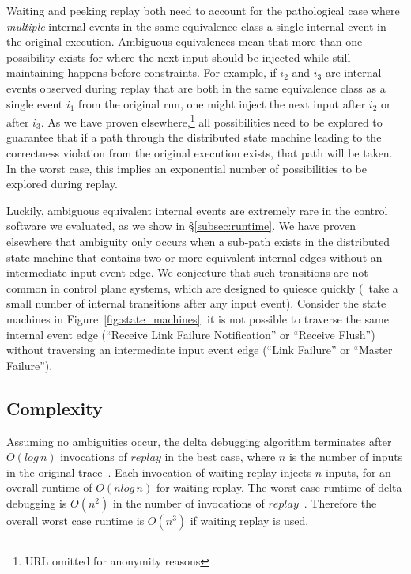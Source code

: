 
Waiting and peeking replay both need to account for the pathological case
where {\em multiple} internal events
in the same
equivalence class a single internal event in the original execution.
Ambiguous equivalences mean that more than one possibility exists for where
the next input should be
injected while still maintaining happens-before constraints. For example, if $i_2$ and $i_3$ are internal events observed
during replay that are both in the same equivalence class as a single event $i_1$ from the
original run, one might inject the next input after $i_2$ or after $i_3$.
As we have proven elsewhere,\footnote{URL omitted for anonymity reasons}
all possibilities need to be explored to guarantee that if a path through the
distributed state machine leading to
the correctness violation from the original execution exists, that path will be taken. In the worst case,
this implies an exponential number of possibilities to be explored during
replay.

Luckily, ambiguous equivalent internal events are extremely rare in the
control software we evaluated, as we
show in \S\ref{subsec:runtime}. We have proven elsewhere that ambiguity only
occurs when a sub-path exists in the distributed state machine that contains two or
more equivalent internal edges without an intermediate input event edge.
We conjecture that such transitions are not common in control plane systems,
which are designed to quiesce quickly (\ie~take a small number of internal
transitions after any input event). Consider the state machines in Figure~\ref{fig:state_machines}:
it is not possible to traverse the same internal event edge (``Receive Link
Failure Notification'' or ``Receive Flush'') without traversing an
intermediate input event edge (``Link Failure'' or ``Master Failure'').

\subsection{Complexity}
\label{subsec:complexity}

Assuming no ambiguities occur, the delta debugging algorithm terminates after
$O(log\,n)$
invocations of $replay$ in the best case, where $n$ is the number of inputs in the original
trace~\cite{Zeller:2002:SIF:506201.506206}. Each invocation of waiting replay
injects $n$ inputs, for an overall runtime of $O(nlog\,n)$ for
waiting replay. The worst case runtime of delta debugging is $O(n^2)$ in the
number of invocations of $replay$~\cite{Zeller:2002:SIF:506201.506206}.
Therefore the overall worst case runtime is $O(n^3)$ if waiting replay is used.

